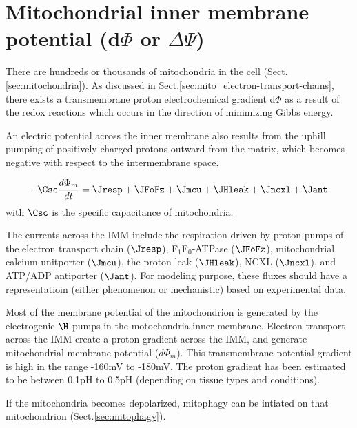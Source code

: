 

\section{Mitochondrial inner membrane potential (d$\Phi$ or $\Delta \Psi$)}
\label{sec:proton-electrochemical-gradient-mito}
\label{sec:mitochondria-inner-membrane-potential}
\label{sec:MIM-potential}

There are hundreds or thousands of mitochondria in the cell
(Sect.\ref{sec:mitochondria}). As discussed in
Sect.\ref{sec:mito_electron-transport-chains}, there exists a transmembrane
proton electrochemical gradient d$\Phi$ as a result of the redox reactions which
occurs in the direction of minimizing Gibbs energy.

An electric potential across the inner membrane also results from the uphill
pumping of positively charged protons outward from the matrix, which becomes
negative with respect to the intermembrane space.

\begin{equation}
-\Csc\frac{d\Phi_m}{dt} = \Jresp + \JFoFz + \Jmcu + \JHleak + \Jncxl + \Jant
\end{equation}
with $\Csc$ is the specific capacitance of mitochondria.

The currents across the IMM include the respiration driven by proton pumps of
the electron transport chain ($\Jresp$), F$_1$F$_0$-ATPase ($\JFoFz$),
mitochondrial calcium unitporter ($\Jmcu$), the proton leak ($\JHleak$), NCXL
($\Jncxl$), and ATP/ADP antiporter ($\Jant$). For modeling purpose, these fluxes
should have a representatioin (either phenomenon or mechanistic) based on
experimental data.

Most of the membrane potential of the mitochondrion is generated by the
electrogenic $\H$ pumps in the motochondria inner membrane.
Electron transport across the IMM create a proton gradient across the IMM, and
generate mitochondrial membrane potential ($d \Phi_m$). This transmembrane
potential gradient is high in the range -160mV to -180mV. The proton gradient
has been estimated to be between 0.1pH to 0.5pH (depending on tissue types and
conditions).

If the mitochondria becomes depolarized, mitophagy can be intiated on that mitochondrion (Sect.\ref{sec:mitophagy}).

